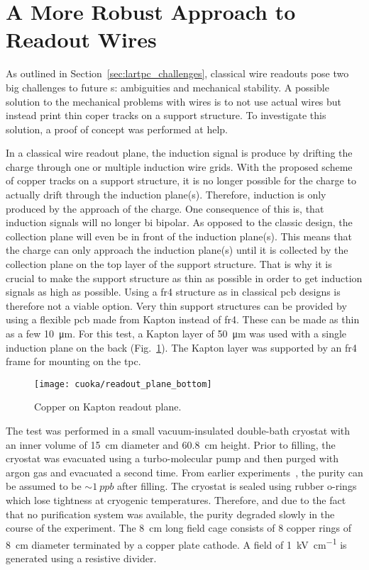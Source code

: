 \section{A More Robust Approach to  Readout Wires}
\label{sec:studies_cuoka}

As outlined in Section~\ref{sec:lartpc_challenges}, classical wire readouts pose two big challenges to future \lartpc{}s: ambiguities and mechanical stability.
A possible solution to the mechanical problems with wires is to not use actual wires but instead print thin coper tracks on a support structure.
To investigate this solution, a proof of concept was performed at \gls{help}.

In a classical wire readout plane, the induction signal is produce by drifting the charge through one or multiple induction wire grids.
With the proposed scheme of copper tracks on a support structure, it is no longer possible for the charge to actually drift through the induction plane(s).
Therefore, induction is only produced by the approach of the charge.
One consequence of this is, that induction signals will no longer bi bipolar.
As opposed to the classic design, the collection plane will even be in front of the induction plane(s).
This means that the charge can only approach the induction plane(s) until it is collected by the collection plane on the top layer of the support structure.
That is why it is crucial to make the support structure as thin as possible in order to get induction signals as high as possible.
Using a \gls{fr4} structure as in classical \gls{pcb} designs is therefore not a viable option.
Very thin support structures can be provided by using a flexible \gls{pcb} made from Kapton instead of \gls{fr4}.
These can be made as thin as a few \SI{10}{\micro\metre}.
For this test, a Kapton layer of \SI{50}{\micro\metre} was used with a single induction plane on the back (Fig.~\ref{fig:cuoka_readout-plane}).
The Kapton layer was supported by an \gls{fr4} frame for mounting on the \gls{tpc}.

\begin{figure}[htb]
	\centering
	\texttt{[image: cuoka/readout\_plane\_bottom]}
	\caption[Copper on Kapton readout plane]{%
		Copper on Kapton readout plane.
	}
	\label{fig:cuoka_readout-plane}
\end{figure}

The test was performed in a small vacuum-insulated double-bath cryostat with an inner volume of \SI{15}{\centi\metre} diameter and \SI{60.8}{\centi\metre} height.
Prior to filling, the cryostat was evacuated using a turbo-molecular pump and then purged with argon gas and evacuated a second time.
From earlier experiments~\cite{2photonAbs}, the purity can be assumed to be $\sim{\SI{1}{ppb}}$ after filling.
The cryostat is sealed using rubber o-rings which lose tightness at cryogenic temperatures.
Therefore, and due to the fact that no purification system was available, the purity degraded slowly in the course of the experiment.
The \SI{8}{\centi\metre} long field cage consists of \num{8} copper rings of \SI{8}{\centi\metre} diameter terminated by a copper plate cathode.
A field of \SI{1}{\kilo\volt\per\centi\metre} is generated using a resistive divider.

